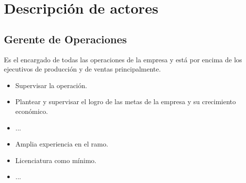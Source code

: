 \section{Descripción de actores}

\begin{Usuario}{\hypertarget{getenteOperaciones}{\subsection{Gerente de Operaciones}}}{
	Es el encargado de todas las operaciones de la empresa y está por encima de los ejecutivos de producción y de ventas principalmente.
}
    \item[Responsabilidades:] \cdtEmpty
    \begin{itemize}
		\item Supervisar la operación.
		\item Plantear y supervisar el logro de las metas de la empresa y su crecimiento económico.
		\item ...
    \end{itemize}

	\item[Perfil:] \cdtEmpty
    \begin{itemize}
		\item Amplia experiencia en el ramo.
		\item Licenciatura como mínimo.
		\item ...
    \end{itemize}
\end{Usuario}